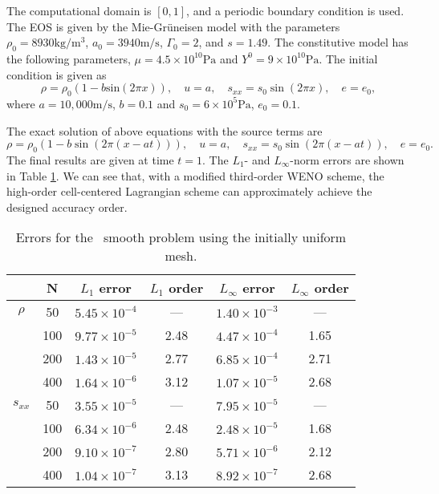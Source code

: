 \documentclass[review]{elsarticle}
\begin{document}
The computational domain is $[0,1]$, and a periodic boundary condition is used. The EOS is given by the Mie-Gr\"uneisen model with the parameters $\rho_0 = 8930 \text{kg}/\text{m}^3$, $a_0 = 3940 \text{m}/\text{s}$, $\Gamma_0 =2$, and $s=1.49$. The constitutive model has the following parameters, $\mu = 4.5\times 10^{10} \text{Pa}$ and $Y^0 = 9\times 10^{10} \text{Pa}$.  The initial condition  is  given as
\begin{equation}
  \rho = \rho_0(1-b \text{sin}(2\pi x)), \quad u = a, \quad  s_{xx} = s_0 \sin(2\pi x), \quad e=e_0,
\end{equation}
where $a = 10,000\text{m}/\text{s}$, $ b = 0.1$  and  $s_0 = 6\times 10^5 \text{Pa}$, $e_0 = 0.1$.


The exact solution of above equations with the source terms are 
\begin{equation}
  \rho = \rho_0(1-b\sin(2\pi(x-at))),\quad u=a,\quad s_{xx}=s_0\sin(2\pi(x-at)),\quad e=e_0.
\end{equation}
The final results are given at time $t = 1$. The  $L_1 $- and $ L_\infty$-norm  errors  are shown in Table \ref{tab:1}. We can see that,  with a  modified third-order WENO scheme, the high-order cell-centered Lagrangian scheme can approximately  achieve the designed  accuracy order.

\begin{table}[htbp]
  \small
  \centering
\setlength{\belowcaptionskip}{10pt}
\caption{\small Errors for the  smooth problem using the initially uniform mesh.}
  \begin{tabular}{cccccc}
\hline
            & N       & $L_1$ error  & $L_1$ order & $L_{\infty}$ error & $L_{\infty}$ order \\
\hline
    $ \rho $      &50           &  $5.45\times 10^{-4}$     &---         &  $1.40\times 10^{-3}$         & ---  \\
                  &100          &  $9.77\times 10^{-5}$     &2.48        &  $4.47\times 10^{-4}$         & 1.65 \\
                  &200          &  $1.43\times 10^{-5}$     &2.77        &  $6.85\times 10^{-4}$         & 2.71 \\
                  &400          &  $1.64\times 10^{-6}$     &3.12        &  $1.07\times 10^{-5}$         & 2.68 \\
\hline
    $s_{xx}$     &50           &  $3.55\times 10^{-5}$     &---         &  $7.95\times 10^{-5}$         & ---  \\
                  &100          &  $6.34\times 10^{-6}$     &2.48        &  $2.48\times 10^{-5}$         & 1.68 \\
                  &200          &  $9.10\times 10^{-7}$     &2.80        &  $5.71\times 10^{-6}$         & 2.12 \\
                  &400          &  $1.04\times 10^{-7}$     &3.13        &  $8.92\times 10^{-7}$         & 2.68 \\
\hline
    \end{tabular}
\label{tab:1}
\end{table}
\end{document}
